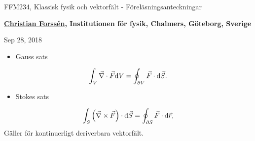 \documentclass[%
oneside,                 %
final,                   %
10pt]{article}
\newenvironment{summary_mdfboxadmon}[1][]{
\begin{summary_mdfboxmdframed}[frametitle=#1]
}
{
\end{summary_mdfboxmdframed}
}
\begin{document}

\newcommand{\exercisesection}[1]{\subsection*{#1}}







\thispagestyle{empty}

\begin{center}
{\LARGE\bf
\begin{spacing}{1.25}
FFM234, Klassisk fysik och vektorfält - Föreläsningsanteckningar
\end{spacing}
}
\end{center}


\begin{center}
{\bf \href{{http://fy.chalmers.se/subatom/tsp/}}{Christian Forssén}, Institutionen för fysik, Chalmers, Göteborg, Sverige${}^{}$} \\ [0mm]
\end{center}

\begin{center}
\end{center}
    

\begin{center}
Sep 28, 2018
\end{center}

\vspace{1cm}



\begin{summary_mdfboxadmon}
\begin{itemize}
\item Gauss sats
\end{itemize}

\noindent
\begin{equation}
  \int_V \vec{\nabla} \cdot \vec{F} \mbox{d}V = \oint_{\partial V} \vec{F} \cdot \mbox{d} \vec{S}.
\end{equation}
\begin{itemize}
\item Stokes sats
\end{itemize}

\noindent
\begin{equation}
  \int_S \left( \vec{\nabla} \times \vec{F}\right) \cdot \mbox{d}\vec{S} = \oint_{\partial S} \vec{F}\cdot
\mbox{d}\vec{r},
\end{equation}
Gäller för kontinuerligt deriverbara vektorfält.
\end{summary_mdfboxadmon} %
\end{document}

